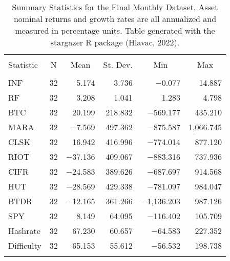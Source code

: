 
\begin{table}[!htbp] \centering 
  \caption{Summary Statistics for the Final Monthly Dataset. Asset nominal returns and growth rates are all annualized and measured in percentage units. Table generated with the stargazer R package (Hlavac, 2022).} 
  \label{SummaryStats_nominal} 
\large 
\begin{tabular}{@{\extracolsep{5pt}}lrrrrr} 
\\[-1.8ex]\hline 
\hline \\[-1.8ex] 
Statistic & \multicolumn{1}{c}{N} & \multicolumn{1}{c}{Mean} & \multicolumn{1}{c}{St. Dev.} & \multicolumn{1}{c}{Min} & \multicolumn{1}{c}{Max} \\ 
\hline \\[-1.8ex] 
INF & 32 & 5.174 & 3.736 & $-$0.077 & 14.887 \\ 
RF & 32 & 3.208 & 1.041 & 1.283 & 4.798 \\ 
BTC & 32 & 20.199 & 218.832 & $-$569.177 & 435.210 \\ 
MARA & 32 & $-$7.569 & 497.362 & $-$875.587 & 1,066.745 \\ 
CLSK & 32 & 16.942 & 416.996 & $-$774.014 & 877.120 \\ 
RIOT & 32 & $-$37.136 & 409.067 & $-$883.316 & 737.936 \\ 
CIFR & 32 & $-$24.583 & 389.626 & $-$687.697 & 914.568 \\ 
HUT & 32 & $-$28.569 & 429.338 & $-$781.097 & 984.047 \\ 
BTDR & 32 & $-$12.165 & 361.266 & $-$1,136.203 & 987.126 \\ 
SPY & 32 & 8.149 & 64.095 & $-$116.402 & 105.709 \\ 
Hashrate & 32 & 67.230 & 60.657 & $-$64.583 & 227.352 \\ 
Difficulty & 32 & 65.153 & 55.612 & $-$56.532 & 198.738 \\ 
\hline \\[-1.8ex] 
\end{tabular} 
\end{table} 
